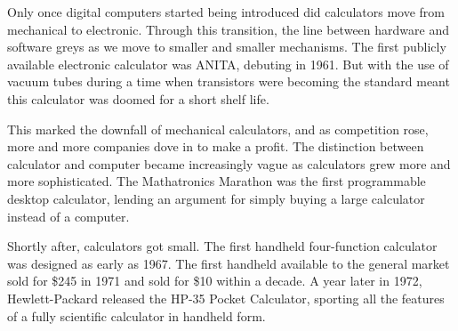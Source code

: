 \documentclass[../computer-history.tex]{subfiles}
\begin{document}
Only once digital computers started being introduced did calculators move from mechanical to electronic. Through this transition, the line between hardware and software greys as we move to smaller and smaller mechanisms. The first publicly available electronic calculator was ANITA, debuting in 1961. But with the use of vacuum tubes during a time when transistors were becoming the standard meant this calculator was doomed for a short shelf life.

This marked the downfall of mechanical calculators, and as competition rose, more and more companies dove in to make a profit. The distinction between calculator and computer became increasingly vague as calculators grew more and more sophisticated. The Mathatronics Marathon was the first programmable desktop calculator, lending an argument for simply buying a large calculator instead of a computer.

Shortly after, calculators got small. The first handheld four-function calculator was designed as early as 1967. The first handheld available to the general market sold for \$245 in 1971 and sold for \$10 within a decade. A year later in 1972, Hewlett-Packard released the HP-35 Pocket Calculator, sporting all the features of a fully scientific calculator in handheld form.

\biblio
\end{document}
